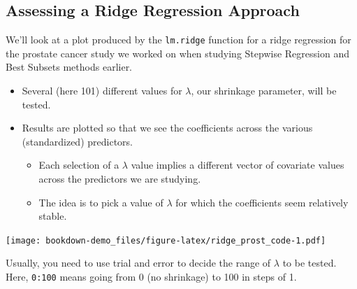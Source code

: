 \documentclass[]{book}
\newenvironment{Shaded}{\begin{snugshade}}{\end{snugshade}}
\newcommand{\KeywordTok}[1]{\textcolor[rgb]{0.13,0.29,0.53}{\textbf{#1}}}
\newcommand{\DataTypeTok}[1]{\textcolor[rgb]{0.13,0.29,0.53}{#1}}
\newcommand{\DecValTok}[1]{\textcolor[rgb]{0.00,0.00,0.81}{#1}}
\newcommand{\StringTok}[1]{\textcolor[rgb]{0.31,0.60,0.02}{#1}}
\newcommand{\OperatorTok}[1]{\textcolor[rgb]{0.81,0.36,0.00}{\textbf{#1}}}
\newcommand{\NormalTok}[1]{#1}
\providecommand{\tightlist}{%
  \setlength{\itemsep}{0pt}\setlength{\parskip}{0pt}}
\theoremstyle{definition}
\theoremstyle{definition}
\theoremstyle{definition}
\theoremstyle{remark}
\begin{document}
\subsection{Assessing a Ridge Regression
Approach}\label{assessing-a-ridge-regression-approach}

We'll look at a plot produced by the \texttt{lm.ridge} function for a
ridge regression for the prostate cancer study we worked on when
studying Stepwise Regression and Best Subsets methods earlier.

\begin{itemize}
\tightlist
\item
  Several (here 101) different values for \(\lambda\), our shrinkage
  parameter, will be tested.
\item
  Results are plotted so that we see the coefficients across the various
  (standardized) predictors.

  \begin{itemize}
  \tightlist
  \item
    Each selection of a \(\lambda\) value implies a different vector of
    covariate values across the predictors we are studying.
  \item
    The idea is to pick a value of \(\lambda\) for which the
    coefficients seem relatively stable.
  \end{itemize}
\end{itemize}

\begin{Shaded}
\end{Shaded}

\texttt{[image: bookdown-demo\_files/figure-latex/ridge\_prost\_code-1.pdf]}

Usually, you need to use trial and error to decide the range of
\(\lambda\) to be tested. Here, \texttt{0:100} means going from 0 (no
shrinkage) to 100 in steps of 1.
\end{document}
